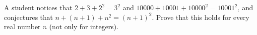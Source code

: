 A student notices that $2+3+2^2=3^2$ and $10000+10001+10000^2=10001^2$, and conjectures that $n+(n+1)+n^2=(n+1)^2$. Prove that this holds for every real number $n$ (not only for integers).
